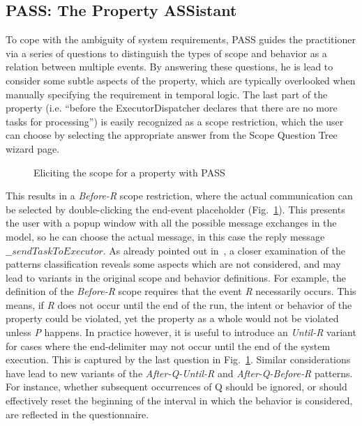 \documentclass[letter]{llncs}
\begin{document}
\label{sec:CaseStudy}
\subsection{PASS: The Property ASSistant} 
To cope with the ambiguity of system requirements, PASS 
guides the practitioner via a series of questions to distinguish the types of scope and 
behavior as a relation between multiple events. By answering these questions, 
he is lead to consider some subtle aspects of the property, which are typically 
overlooked when manually specifying the requirement in temporal logic.
The last part of the property (i.e. ``before the ExecutorDispatcher
declares that there are no more tasks for processing'') is easily recognized as a scope restriction,
which the user can choose by selecting the appropriate answer from the Scope Question Tree wizard page.
\begin{figure}[!t]
\centering
{%
\setlength{\fboxsep}{1.5pt}%
\setlength{\fboxrule}{0.5pt}%
%
}%
\caption{Eliciting the scope for a property with PASS}
\label{fig:ScopePASS}
\end{figure}
This results in a \emph{Before-R} scope restriction, where the actual communication can be selected by double-clicking the end-event placeholder (Fig.~\ref{fig:ScopePASS}).
This presents the user with a popup window with all the possible message exchanges in the model, so he can choose the actual message, in this case
the reply message $\_\_sendTaskToExecutor$.
As already pointed out in~\cite{Smith02propel:an}, a closer examination of the patterns classification reveals some aspects
which are not considered, and may lead to variants in the original scope and behavior definitions. 
For example, the definition of the \emph{Before-R} scope requires that the event \emph{R} necessarily
occurs. This means, if \emph{R} does not occur until the end of the run, the intent or behavior 
of the property could be violated, yet the property as a whole would not be violated 
unless \emph{P} happens. In practice however, it is useful to introduce an \emph{Until-R} variant for cases where the end-delimiter may not occur until the end of 
the system execution. This is captured by the last question in Fig.~\ref{fig:ScopePASS}.
Similar considerations have lead to new variants of the \emph{After-Q-Until-R} and \emph{After-Q-Before-R} patterns.
For instance, whether subsequent occurrences of Q should be ignored, or should effectively reset the beginning of the interval
in which the behavior is considered, are reflected in the questionnaire.
\end{document}
